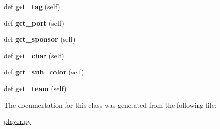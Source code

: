 \begin{DoxyCompactItemize}
def {\bfseries get\+\_\+tag} (self)
\item 
\mbox{\label{classssbm-py_1_1player_1_1_player_a5773bdb0017fdbf0f329f1186d6fc9d6}} 
def {\bfseries get\+\_\+port} (self)
\item 
\mbox{\label{classssbm-py_1_1player_1_1_player_a84b4b42045bd05d3619edcc52159a710}} 
def {\bfseries get\+\_\+sponsor} (self)
\item 
\mbox{\label{classssbm-py_1_1player_1_1_player_a9642f6dbf8c2fbe2fcabdced55fe6913}} 
def {\bfseries get\+\_\+char} (self)
\item 
\mbox{\label{classssbm-py_1_1player_1_1_player_ad0147eb4ccff73c6708a23a2f6a02be4}} 
def {\bfseries get\+\_\+sub\+\_\+color} (self)
\item 
\mbox{\label{classssbm-py_1_1player_1_1_player_ac9d3031930eb64515b9e836eb785237a}} 
def {\bfseries get\+\_\+team} (self)
\end{DoxyCompactItemize}


The documentation for this class was generated from the following file\+:\begin{DoxyCompactItemize}
\item 
\hyperlink{player_8py}{player.\+py}\end{DoxyCompactItemize}
